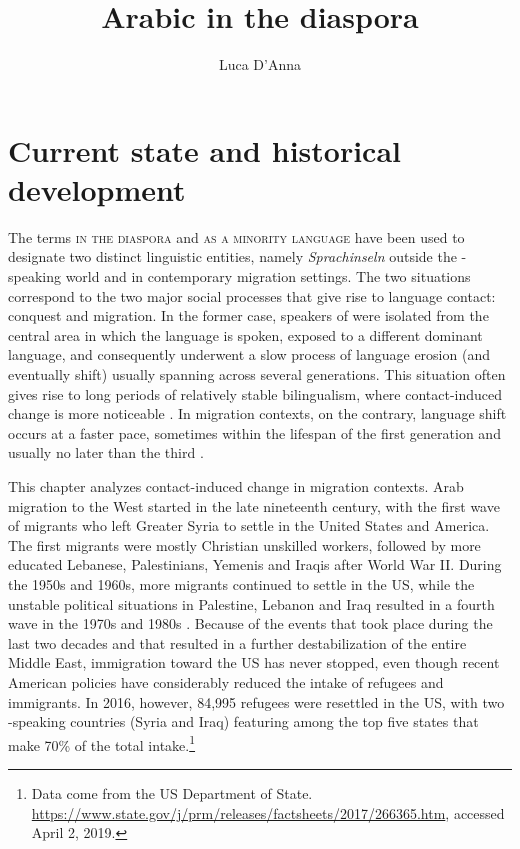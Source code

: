 \documentclass[output=paper]{langsci/langscibook}
\author{Luca D'Anna\affiliation{Università degli Studi di Napoli ``L'Orientale''}}
\title{Arabic in the diaspora}
\begin{document}
\maketitle 

\section{Current state and historical development}

The terms \textsc{ in the diaspora} and \textsc{ as a minority language} have been used to designate two distinct linguistic entities, namely  \textit{Sprachinseln} outside the -speaking world and  in contemporary migration settings. The two situations correspond to the two major social processes that give rise to language contact: conquest and migration. In the former case, speakers of  were isolated from the central area in which the  language is spoken, exposed to a different dominant language, and consequently underwent a slow process of {language erosion} (and eventually shift) usually spanning across several generations. This situation often gives rise to long periods of relatively stable {bilingualism}, where contact-induced change is more noticeable \citep[641]{Sankoff2001}. In migration contexts, on the contrary, {language shift} occurs at a faster pace, sometimes within the lifespan of the first generation and usually no later than the third \citep[151]{Canagarajah2008}. 

This chapter analyzes contact-induced change in migration contexts. Arab migration to the West started in the late nineteenth century, with the first wave of migrants who left Greater Syria to settle in the United States and  America. The first migrants were mostly {Christian} unskilled workers, followed by more educated Lebanese, Palestinians, Yemenis and Iraqis after World War II. During the 1950s and 1960s, more migrants continued to settle in the US, while the unstable political situations in Palestine, Lebanon and Iraq resulted in a fourth wave in the 1970s and 1980s \citep[17--18]{Rouchdy_introduction_1992}. Because of the events that took place during the last two decades and that resulted in a further destabilization of the entire Middle East, immigration toward the US has never stopped, even though recent American policies have considerably reduced the intake of refugees and immigrants. In 2016, however, 84,995 refugees were resettled in the US, with two -speaking countries (Syria and Iraq) featuring among the top five states that make 70\% of the total intake.\footnote{Data come from the US Department of State. \url{https://www.state.gov/j/prm/releases/factsheets/2017/266365.htm}, accessed April 2, 2019.}
\end{document}
